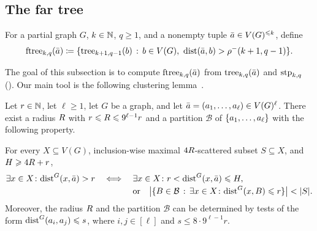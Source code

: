 \subsection{The far tree}\label{sec:ftree}

\begin{definition}\label{def:ftree}
For a partial graph $G$, $k\in\mathbb N$, $q\ge1$, and a nonempty tuple $\bar a\in V(G)^{\leqslant k}$, define
\[
\textnormal{ftree}_{k,q}(\bar a)\coloneqq
\{\mathrm{tree}_{k+1,q-1}(b) \,:\, b\in V(G),\ \mathrm{dist}(\bar a,b)>\rho^-(k+1,q-1) \}.
\]
\end{definition}

The goal of this subsection is to compute $\textnormal{ftree}_{k,q}(\bar a)$ from $\mathrm{tree}_{k,q}(\bar a)$ and $\textnormal{stp}_{k,q}$ ().
Our main tool is the following clustering lemma~\cite[Corollary~3.4 and Lemma~3.5]{locality-note}.

\begin{lemma}\label{lem:clustering}
Let $r\in\mathbb N$, let $\ell\ge1$, let $G$ be a graph, and let $\bar a=(a_1,\ldots,a_\ell)\in V(G)^\ell$.
There exist a radius $R$ with $r\leqslant R\leqslant9^{\ell-1}r$ and a partition $\mathcal B$ of $\{a_1,\ldots,a_\ell\}$ with the following property.

For every $X\subseteq V(G)$, inclusion-wise maximal $4R$-scattered subset $S \subseteq X$, and $H\geqslant4R+r$,
\[
\exists x\in X\colon \mathrm{dist}^G(x,\bar a)>r
\quad\Longleftrightarrow\quad
\begin{aligned}[t]
&\exists x\in X\colon r<\mathrm{dist}^G(x,\bar a)\leqslant H,\\[-2pt]
&\text{or}\quad \bigl|\{B\in\mathcal B \,:\, \exists x\in X\colon \mathrm{dist}^G(x,B)\leqslant r \}\bigr|< |S|.
\end{aligned}
\]
Moreover, the radius $R$ and the partition $\mathcal B$ can be determined by tests of the form $\mathrm{dist}^G(a_i,a_j)\leqslant s$, where $i,j\in[\ell]$ and $s\le8\cdot9^{\ell-1}r$.
\end{lemma}

